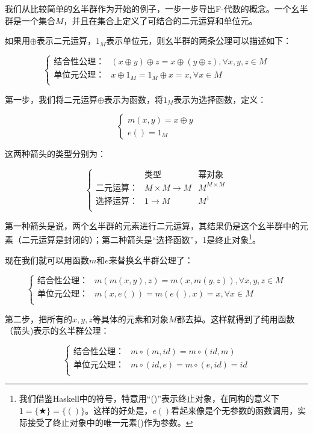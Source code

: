\documentclass{article}
\begin{document}
\begin{example}
我们从比较简单的幺半群作为开始的例子，一步一步导出F-代数的概念。一个幺半群是一个集合$M$，并且在集合上定义了可结合的二元运算和单位元。

如果用$\oplus$表示二元运算，$1_M$表示单位元，则幺半群的两条公理可以描述如下：

\[
\begin{cases}
\text{结合性公理：} & (x \oplus y) \oplus z = x \oplus (y \oplus z), \forall x, y, z \in M \\
\text{单位元公理：} & x \oplus 1_M = 1_M \oplus x = x, \forall x \in M \\
\end{cases}
\]

第一步，我们将二元运算$\oplus$表示为函数，将$1_M$表示为选择函数，定义：

\[
\begin{cases}
m (x, y) = x \oplus y \\
e () = 1_M
\end{cases}
\]

这两种箭头的类型分别为：

\[
\left \{
\begin{array}{lll}
 & \text{类型} & \text{幂对象} \\
\text{二元运算：} & M \times M \to M & M^{M \times M}\\
\text{选择运算：} & 1 \to M & M^1 \\
\end{array}
\right .
\]

第一种箭头是说，两个幺半群的元素进行二元运算，其结果仍是这个幺半群中的元素（二元运算是封闭的）；第二种箭头是“选择函数”，1是终止对象\footnote{我们借鉴Haskell中的符号，特意用“()”表示终止对象，在同构的意义下$1 = \{ \bigstar \} = \{ () \}$。这样的好处是，$e()$看起来像是个无参数的函数调用，实际接受了终止对象中的唯一元素()作为参数。}。

现在我们就可以用函数$m$和$e$来替换幺半群公理了：

\[
\begin{cases}
\text{结合性公理：} & m(m(x, y), z) = m(x, m(y, z)), \forall x, y, z \in M \\
\text{单位元公理：} & m(x, e()) = m(e(), x) = x, \forall x \in M \\
\end{cases}
\]

第二步，把所有的$x, y, z$等具体的元素和对象$M$都去掉。这样就得到了纯用函数（箭头)表示的幺半群公理：

\[
\begin{cases}
\text{结合性公理：} & m \circ (m, id) = m \circ (id, m) \\
\text{单位元公理：} & m \circ (id, e) = m \circ (e, id) = id \\
\end{cases}
\]


\end{example}
\end{document}
